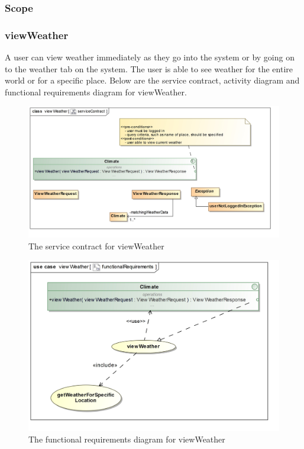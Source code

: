 \subsubsection{Scope}


\subsubsection{viewWeather}

A user can view weather immediately as they go into the system or by going on to the weather tab on the system. The user is able to see weather for the entire world or for a specific place. Below are the service contract, activity diagram and functional requirements diagram for viewWeather.

\begin{figure}[H]
	\centering
	\includegraphics[width=1.0\textwidth]{../images/funcReq/viewWeatherServiceContract.jpg}
	\caption{The service contract for viewWeather \label{overflow}}
\end{figure}

\begin{figure}[H]
	\centering
	\includegraphics[width=1.0\textwidth]{../images/funcReq/viewWeatherFunctionalRequirements.jpg}
	\caption{The functional requirements diagram for viewWeather \label{overflow}}
\end{figure}

